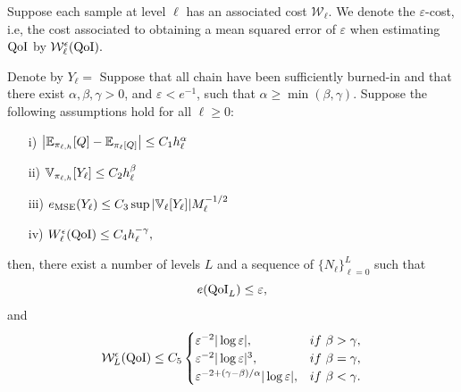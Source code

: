 \begin{definition}
	Suppose each sample at level $\ell$ has an associated cost $\mathcal{W}_\ell$. We denote the $\varepsilon$-cost, i.e, the cost associated to obtaining a mean squared error of $\varepsilon$ when estimating $\text{QoI}$ by $\mathcal{W}_\ell^\epsilon(\text{QoI}).$ 
\end{definition}
\begin{theorem}
Denote by $Y_\ell=$	Suppose that all chain have been sufficiently burned-in and that there exist $\alpha,\beta,\gamma>0$, and $\varepsilon<e^{-1}$, such that $\alpha\geq\min(\beta,\gamma)$. Suppose the following assumptions hold for all $\ell\geq 0 $: \begin{enumerate}
		\item[i)] $\left \vert \mathbb{E}_{\pi_{\ell,h}}[Q]-\mathbb{E}_{\pi_\ell[Q]}\right \vert \leq C_1 h_\ell^{\alpha  }$
		\item[ii)] $\mathbb{V}_{\pi_{\ell,h}}[Y_\ell]\leq C_2 h_\ell^{\beta}$
		\item[iii)] $e_\text{MSE}(Y_\ell)\leq C_3 \sup|\mathbb{V}_{\ell}[Y_\ell]|M_\ell^{-1/2}$
		\item[iv)] $W_\ell^\epsilon(\text{QoI})\leq C_4h_\ell^{-\gamma},$
	\end{enumerate}
	then, there exist a number of levels $L$ and a sequence of $\{N_\ell\}_{\ell=0}^L$ such that $$e(\text{QoI}_{L})\leq\varepsilon,$$ and \begin{align}
	\mathcal{W}_L^\epsilon(\QoI)\leq C_5\begin{cases}
	\varepsilon^{-2}|\log\varepsilon|, & if \ \beta>\gamma,\\
	\varepsilon^{-2}|\log\varepsilon|^3, & if \ \beta=\gamma,\\
	\varepsilon^{-2+(\gamma-\beta)/\alpha}|\log\varepsilon|, & if \ \beta<\gamma.\\
	\end{cases}
	\end{align}
\end{theorem}  



